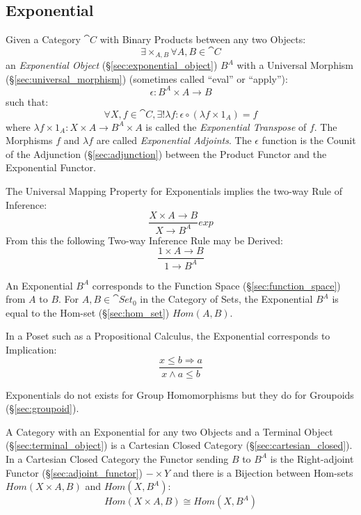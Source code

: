 \subsection{Exponential}\label{sec:category_exponential}

Given a Category $\cat{C}$ with Binary Products between any two
Objects:
\[
  \exists \times_{A,B} \forall A,B \in \cat{C}
\]
an \emph{Exponential Object} (\S\ref{sec:exponential_object}) $B^A$
with a Universal Morphism (\S\ref{sec:universal_morphism}) (sometimes
called ``eval'' or ``apply''):
\[
  \epsilon : B^A \times A \rightarrow B
\]
such that:
\[
  \forall X, f \in \cat{C}, \exists ! \lambda f :
  \epsilon \circ (\lambda f \times 1_A) = f
\]
where $\lambda f \times 1_A : X \times A \rightarrow B^A \times A$ is
called the \emph{Exponential Transpose} of $f$. The Morphisms $f$ and
$\lambda f$ are called \emph{Exponential Adjoints}. The $\epsilon$
function is the Counit of the Adjunction (\S\ref{sec:adjunction}) between
the Product Functor and the Exponential Functor.

The Universal Mapping Property for Exponentials implies the two-way
Rule of Inference:
\[
  {
    \frac{X \times A \rightarrow B}
    {X \rightarrow B^A}
  }exp
\]
From this the following Two-way Inference Rule may be Derived:
\[
    \frac{1 \times A \rightarrow B}
    {1 \rightarrow B^A}
\]

An Exponential $B^A$ corresponds to the Function Space
(\S\ref{sec:function_space}) from $A$ to $B$. For $A,B \in
\cat{Set}_0$ in the Category of Sets, the Exponential $B^A$ is
equal to the Hom-set (\S\ref{sec:hom_set}) $Hom(A,B)$.

In a Poset such as a Propositional Calculus, the Exponential
corresponds to Implication:
\[
    \frac{x \leq b \Rightarrow a}
    {x \wedge a \leq b}
\]

Exponentials do not exists for Group Homomorphisms but they do for
Groupoids (\S\ref{sec:groupoid}).

A Category with an Exponential for any two Objects and a Terminal
Object (\S\ref{sec:terminal_object}) is a Cartesian Closed Category
(\S\ref{sec:cartesian_closed}). In a Cartesian Closed Category the
Functor sending $B$ to $B^A$ is the Right-adjoint Functor
(\S\ref{sec:adjoint_functor}) $- \times Y$ and there is a Bijection
between Hom-sets $Hom(X \times A, B)$ and $Hom(X, B^A)$:
\[
  Hom(X \times A, B) \cong Hom(X, B^A)
\]

